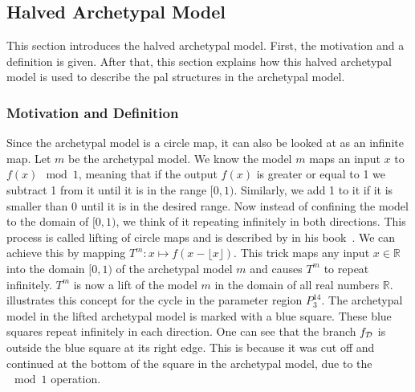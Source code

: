 \subsection{Halved Archetypal Model}
\label{sec:add.add.halved}

This section introduces the halved archetypal model.
First, the motivation and a definition is given.
After that, this section explains how this halved archetypal model is used to describe the \gls{pal} structures in the archetypal model.

\subsubsection{Motivation and Definition}

Since the archetypal model is a circle map, it can also be looked at as an infinite map.
Let $m$ be the archetypal model.
We know the model $m$ maps an input $x$ to $f(x) \mod 1$, meaning that if the output $f(x)$ is greater or equal to 1 we subtract 1 from it until it is in the range $[0, 1)$.
Similarly, we add 1 to it if it is smaller than 0 until it is in the desired range.
Now instead of confining the model to the domain of $[0, 1)$, we think of it repeating infinitely in both directions.
This process is called lifting of circle maps and is described by  in his book~\cite{devaney2021introduction}.
We can achieve this by mapping $T^m: x \mapsto f(x - \lfloor x \rfloor)$.
This trick maps any input $x \in \mathbb{R}$ into the domain $[0, 1)$ of the archetypal model $m$ and causes $T^m$ to repeat infinitely.
$T^m$ is now a lift of the model $m$ in the domain of all real numbers $\mathbb{R}$.
 illustrates this concept for the cycle in the parameter region $P^{14}_3$.
The archetypal model in the lifted archetypal model is marked with a blue square.
These blue squares repeat infinitely in each direction.
One can see that the branch $f_{\mathcal{D}}$ is outside the blue square at its right edge.
This is because it was cut off and continued at the bottom of the square in the archetypal model, due to the $\mod 1$ operation.

